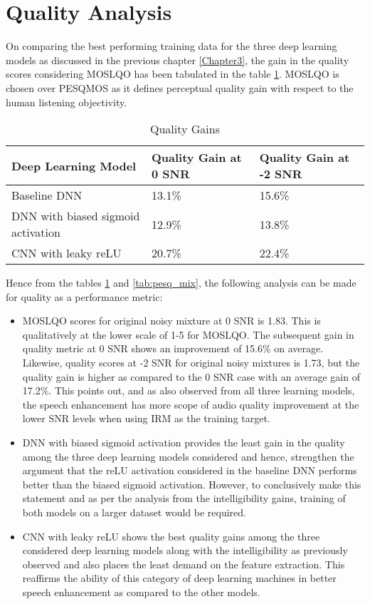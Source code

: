 \section{Quality Analysis}
On comparing the best performing training data for the three deep learning models as discussed in the previous chapter \ref{Chapter3}, the gain in the quality scores considering MOSLQO has been tabulated in the table \ref{tab:q_gain_compare}. MOSLQO is chosen over PESQMOS as it defines perceptual quality gain with respect to the human listening objectivity.\\
\begin{table}[!htbp]
\centering
\begin{tabular}{|p{8cm}|p{3cm}|p{4cm}|}
\hline
\textbf{Deep Learning Model} & \textbf{Quality Gain at 0 SNR} & \textbf{Quality Gain at -2 SNR}\\
\hline
Baseline DNN & 13.1\% & 15.6\%\\
\hline
DNN with biased sigmoid activation  & 12.9\% & 13.8\%\\
\hline
CNN with leaky reLU & 20.7\% & 22.4\%\\
\hline
\end{tabular}
\caption{Quality Gains}
\label{tab:q_gain_compare}
\end{table}

Hence from the tables \ref{tab:q_gain_compare} and \ref{tab:pesq_mix}, the following analysis can be made for quality as a performance metric:
\begin{itemize}
\item MOSLQO scores for original noisy mixture at 0 SNR is 1.83. This is qualitatively at the lower scale of 1-5 for MOSLQO. The subsequent gain in quality metric at 0 SNR shows an improvement of 15.6\% on average. Likewise, quality scores at -2 SNR for original noisy mixtures is 1.73, but the quality gain is higher as compared to the 0 SNR case with an average gain of 17.2\%. This points out, and as also observed from all three learning models, the speech enhancement has more scope of audio quality improvement at the lower SNR levels when using IRM as the training target. 
\item DNN with biased sigmoid activation provides the least gain in the quality among the three deep learning models considered and hence, strengthen the argument that the reLU activation considered in the baseline DNN performs better than the biased sigmoid activation. However, to conclusively make this statement and as per the analysis from the intelligibility gains, training of both models on a larger dataset would be required.
\item CNN with leaky reLU shows the best quality gains among the three considered deep learning models along with the intelligibility as previously observed and also places the least demand on the feature extraction. This reaffirms the ability of this category of deep learning machines in better speech enhancement as compared to the other models.
\end{itemize}
